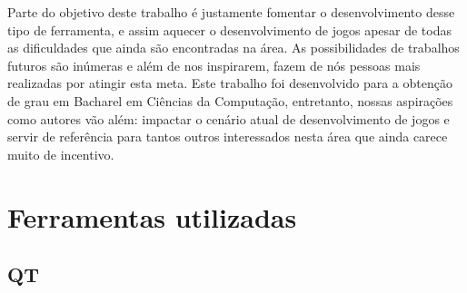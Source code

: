 \documentclass[brazil]{abnt}
\begin{document}
Parte do objetivo deste trabalho é justamente fomentar o desenvolvimento desse tipo de ferramenta, e assim aquecer o desenvolvimento de jogos apesar de todas as dificuldades que ainda são encontradas na área. As possibilidades de trabalhos futuros são inúmeras e além de nos inspirarem, fazem de nós pessoas mais realizadas por atingir esta meta. Este trabalho foi desenvolvido para a obtenção de grau em Bacharel em Ciências da Computação, entretanto, nossas aspirações como autores vão além: impactar o cenário atual de desenvolvimento de jogos e servir de referência para tantos outros interessados nesta área que ainda carece muito de incentivo.





\anexo

\chapter{Ferramentas utilizadas}

\section{QT}
\end{document}
